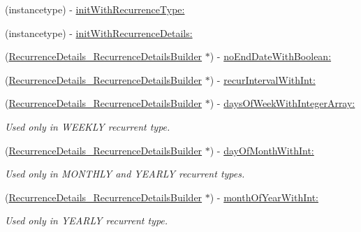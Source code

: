 \begin{DoxyCompactItemize}
\item 
(instancetype) -\/ \hyperlink{interface_recurrence_details___recurrence_details_builder_a0896b46d745b4c1415ae7387b3cfe092}{init\+With\+Recurrence\+Type\+:}
\item 
(instancetype) -\/ \hyperlink{interface_recurrence_details___recurrence_details_builder_aac399658c0b65d97b3d80e36d8c3eee3}{init\+With\+Recurrence\+Details\+:}
\item 
(\hyperlink{interface_recurrence_details___recurrence_details_builder}{Recurrence\+Details\+\_\+\+Recurrence\+Details\+Builder} $\ast$) -\/ \hyperlink{interface_recurrence_details___recurrence_details_builder_af9b756ac7b525e012eed96a2f2e4b628}{no\+End\+Date\+With\+Boolean\+:}
\item 
(\hyperlink{interface_recurrence_details___recurrence_details_builder}{Recurrence\+Details\+\_\+\+Recurrence\+Details\+Builder} $\ast$) -\/ \hyperlink{interface_recurrence_details___recurrence_details_builder_a13f440bb73a6b91c62d33c1802ea3f68}{recur\+Interval\+With\+Int\+:}
\item 
(\hyperlink{interface_recurrence_details___recurrence_details_builder}{Recurrence\+Details\+\_\+\+Recurrence\+Details\+Builder} $\ast$) -\/ \hyperlink{interface_recurrence_details___recurrence_details_builder_a3e8d68e518bf09f3c2bb4c1b93dcafc8}{days\+Of\+Week\+With\+Integer\+Array\+:}
\begin{DoxyCompactList}\small\item\em Used only in W\+E\+E\+K\+L\+Y recurrent type. \end{DoxyCompactList}\item 
(\hyperlink{interface_recurrence_details___recurrence_details_builder}{Recurrence\+Details\+\_\+\+Recurrence\+Details\+Builder} $\ast$) -\/ \hyperlink{interface_recurrence_details___recurrence_details_builder_abf736e5b8baa50069db7ec88d062846e}{day\+Of\+Month\+With\+Int\+:}
\begin{DoxyCompactList}\small\item\em Used only in M\+O\+N\+T\+H\+L\+Y and Y\+E\+A\+R\+L\+Y recurrent types. \end{DoxyCompactList}\item 
(\hyperlink{interface_recurrence_details___recurrence_details_builder}{Recurrence\+Details\+\_\+\+Recurrence\+Details\+Builder} $\ast$) -\/ \hyperlink{interface_recurrence_details___recurrence_details_builder_a44e03f76c42064408839620fb64f9f5f}{month\+Of\+Year\+With\+Int\+:}
\begin{DoxyCompactList}\small\item\em Used only in Y\+E\+A\+R\+L\+Y recurrent type. \end{DoxyCompactList}\item 

\end{DoxyCompactItemize}
